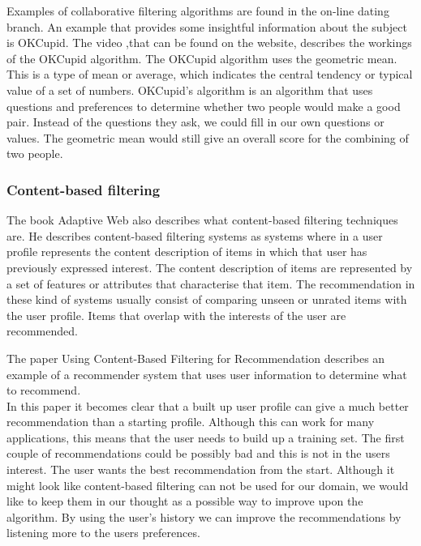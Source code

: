 Examples of collaborative filtering algorithms are found in the on-line dating branch.
An example that provides some insightful information about the subject is OKCupid.
The video ,that can be found on the website\cite{okcupid}, describes the workings of the OKCupid algorithm.
The OKCupid algorithm uses the geometric mean.
This is a type of mean or average, which indicates the central tendency or typical value of a set of numbers.
OKCupid's algorithm is an algorithm that uses questions and preferences to determine whether two people would make a good pair.
Instead of the questions they ask, we could fill in our own questions or values.
The geometric mean would still give an overall score for the combining of two people.

\subsubsection*{Content-based filtering}
The book Adaptive Web \citep{Peter2007} also describes what content-based filtering techniques are.
He describes content-based filtering systems as systems where in a user profile represents the content description of items in which that user has previously expressed interest.
The content description of items are represented by a set of features or attributes that characterise that item.
The recommendation in these kind of systems usually consist of comparing unseen or unrated items with the user profile.
Items that overlap with the interests of the user are recommended.

The paper Using Content-Based Filtering for Recommendation \cite{van2000using} describes an example of a recommender system that uses user information to determine what to recommend.\\
In this paper it becomes clear that a built up user profile can give a much better recommendation than a starting profile.
Although this can work for many applications, this means that the user needs to build up a training set.
The first couple of recommendations could be possibly bad and this is not in the users interest.
The user wants the best recommendation from the start.
Although it might look like content-based filtering can not be used for our domain, we would like to keep them in our thought as a possible way to improve upon the algorithm.
By using the user's history we can improve the recommendations by listening more to the users preferences.

